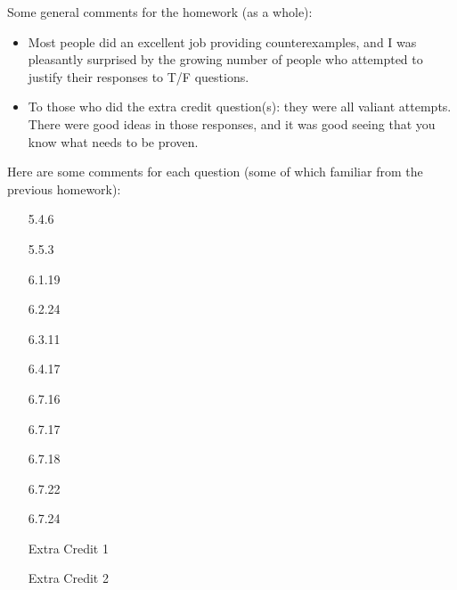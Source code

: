 \documentclass{amsart}
\theoremstyle{definition}
\theoremstyle{definition}
\DeclareMathOperator{\1}{\mathbbm{1}}
\begin{document}
Some general comments for the homework (as a whole):
\begin{itemize}
	\item Most people did an excellent job providing counterexamples, and I was pleasantly surprised by the growing number of people who attempted to justify their responses to T/F questions.
	
	\item To those who did the extra credit question(s): they were all valiant attempts. There were good ideas in those responses, and it was good seeing that you know what needs to be proven.
\end{itemize}

\noindent Here are some comments for each question (some of which familiar from the previous homework):

\bigskip

\begin{enumerate}[itemsep = 2mm]
	\item[5.4.6] 
	
	
	
	\item[5.5.3]
	
	
	
	\item[6.1.19]
	
	
	
	\item[6.2.24]
	
	
	
	\item[6.3.11]
	
	
	\item[6.4.17]
	
	
	\item[6.7.16]
	
	
	\item[6.7.17]
	
	
	\item[6.7.18]
	
	
	\item[6.7.22]
	
	
	\item[6.7.24]
	
	
	
	\item[Extra Credit 1]
	
	
	
	\item[Extra Credit 2]
\end{enumerate}

	
\end{document}
